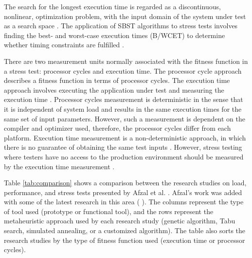 \documentclass[espaco=umemeio,chapter=TITLE,twoside,openright]{abnt}
\begin{document}
The search for the longest execution time is regarded as a discontinuous, nonlinear, optimization problem, with the input domain of the system under test as a search space \cite{Sullivan}.  The application of SBST algorithms to  stress tests involves finding the best- and worst-case execution times (B/WCET) to determine whether timing constraints are fulfilled \cite{Afzal2009a}.

There are two measurement units normally associated with the fitness function in a stress test: processor cycles and execution time. The processor cycle approach describes a fitness function in terms of processor cycles. The execution time approach involves executing the application under test and measuring the execution time \cite{Afzal2009a} \cite{tracey2000search}. Processor cycles measurement is deterministic in the sense that it is independent of system load and results in the same execution times for the same set of input parameters. However, such a measurement is dependent on the compiler and optimizer used, therefore, the processor cycles differ from each platform. Execution time measurement is a non-deterministic approach, in which there is no guarantee of obtaining the same test inputs \cite{Afzal2009a}.  However, stress testing where testers have no access to the production environment should be measured by the execution time measurement \cite{Molyneaux2009} \cite{Afzal2009a}.

Table \ref{tab:comparison}  shows a comparison between the research studies on load, performance, and stress tests presented by Afzal et al. \cite{Afzal2009a}. Afzal's work was added with some of the latest research in this area (\cite{Garousi2006} \cite{Garousi2010} \cite{DiAlesio2013} \cite{DiAlesio2014} \cite{Alesio2015} \cite{Gois2016} ). The columns represent the type of tool used (prototype or functional tool), and the rows represent the metaheuristic approach used by each research study (genetic algorithm, Tabu search, simulated annealing, or a customized algorithm). The table also sorts the research studies by the type of fitness function used (execution time or processor cycles).
\end{document}
